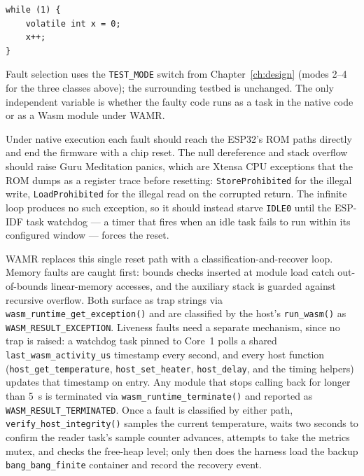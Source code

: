 \documentclass[12pt, a4paper]{report}
\begin{document}
\begin{lstlisting}[style=csnippet,caption={Tight loop with no host callback (\texttt{fault\_infinite\_loop.c}).},label={lst:fault-loop}]
while (1) {
    volatile int x = 0;
    x++;
}
\end{lstlisting}

Fault selection uses the \texttt{TEST\_MODE} switch from Chapter~\ref{ch:design} (modes 2--4 for the three classes above); the surrounding testbed is unchanged. The only independent variable is whether the faulty code runs as a task in the native code or as a Wasm module under WAMR.

Under native execution each fault should reach the ESP32's ROM paths directly and end the firmware with a chip reset. The null dereference and stack overflow should raise Guru Meditation panics, which are Xtensa CPU exceptions that the ROM dumps as a register trace before resetting: \texttt{StoreProhibited} for the illegal write, \texttt{LoadProhibited} for the illegal read on the corrupted return. The infinite loop produces no such exception, so it should instead starve \texttt{IDLE0} until the ESP-IDF task watchdog --- a timer that fires when an idle task fails to run within its configured window --- forces the reset.

WAMR replaces this single reset path with a classification-and-recover loop. Memory faults are caught first: bounds checks inserted at module load catch out-of-bounds linear-memory accesses, and the auxiliary stack is guarded against recursive overflow. Both surface as trap strings via \texttt{wasm\_runtime\_get\_exception()} and are classified by the host's \texttt{run\_wasm()} as \texttt{WASM\_RESULT\_EXCEPTION}. Liveness faults need a separate mechanism, since no trap is raised: a watchdog task pinned to Core~1 polls a shared \texttt{last\_wasm\_activity\_us} timestamp every second, and every host function (\texttt{host\_get\_temperature}, \texttt{host\_set\_heater}, \texttt{host\_delay}, and the timing helpers) updates that timestamp on entry. Any module that stops calling back for longer than 5~s is terminated via \texttt{wasm\_runtime\_terminate()} and reported as \texttt{WASM\_RESULT\_TERMINATED}. Once a fault is classified by either path, \texttt{verify\_host\_integrity()} samples the current temperature, waits two seconds to confirm the reader task's sample counter advances, attempts to take the metrics mutex, and checks the free-heap level; only then does the harness load the backup \texttt{bang\_bang\_finite} container and record the recovery event.
\end{document}
